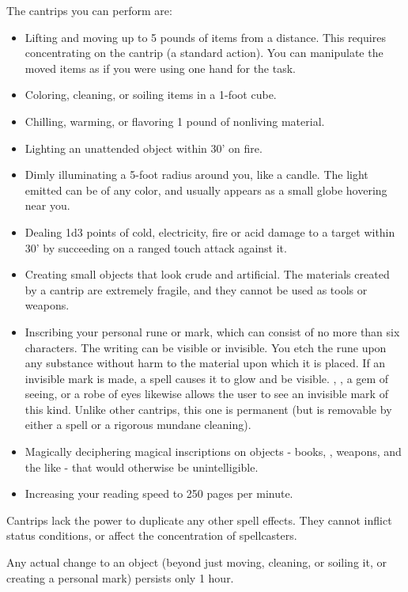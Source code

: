 The cantrips you can perform are:
\begin{itemize}
 \item Lifting and moving up to 5 pounds of items from a distance.
This requires concentrating on the cantrip (a standard action).
You can manipulate the moved items as if you were using one hand for the task.
 \item Coloring, cleaning, or soiling items in a 1-foot cube.
 \item Chilling, warming, or flavoring 1 pound of nonliving material. 
 \item Lighting an unattended object within 30' on fire.
 \item Dimly illuminating a 5-foot radius around you, like a candle. 
The light emitted can be of any color, and usually appears as a small globe hovering near you. 
 \item Dealing 1d3 points of cold, electricity, fire or acid damage to a target within 30' by succeeding on a ranged touch attack against it.
 \item Creating small objects that look crude and artificial. 
The materials created by a cantrip are extremely fragile, and they cannot be used as tools or weapons. 
 \item Inscribing your personal rune or mark, which can consist of no more than six characters. 
The writing can be visible or invisible. 
You etch the rune upon any substance without harm to the material upon which it is placed. 
If an invisible mark is made, a  spell causes it to glow and be visible.
, , a gem of seeing, or a robe of eyes likewise allows the user to see an invisible mark of this kind. 
Unlike other cantrips, this one is permanent (but is removable by either a  spell or a rigorous mundane cleaning).
 \item Magically deciphering magical inscriptions on objects - books, , weapons, and the like - that would otherwise be unintelligible.
 \item Increasing your reading speed to 250 pages per minute.
\end{itemize}

Cantrips lack the power to duplicate any other spell effects.
They cannot inflict status conditions, or affect the concentration of spellcasters.

Any actual change to an object (beyond just moving, cleaning, or soiling it, or creating a personal mark) persists only 1 hour.
